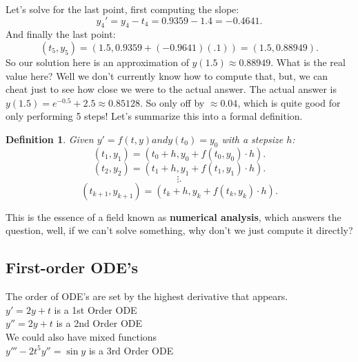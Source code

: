 \documentclass[10pt, oneside]{report}
\newtheorem{defn}{Definition}
\begin{document}
Let's solve for the last point, first computing the slope:
\[
y_4' = y_4-t_4 = 0.9359 - 1.4 = -0.4641
.\] 
And finally the last point:
\[
    (t_5, y_5) = (1.5, 0.9359 + (-0.9641)(.1)) = (1.5, 0.88949)
.\] 
So our solution here is an approximation of $y(1.5) \approx 0.88949$.  What is the real value here? Well we don't currently know how to compute that, but, we can cheat just to see how close we were to the actual answer.  The actual answer is $y(1.5) = e^{-0.5} + 2.5 \approx 0.85128$.  So only off by $\approx 0.04$, which is quite good for only performing 5 steps! Let's summarize this into a formal definition.  
\begin{defn}
    Given $y' = f(t, y) and y(t_0) = y_0$ with a stepsize $h$:
    \[
        (t_1, y_1) = (t_0 + h, y_0+f(t_0, y_0) \cdot h)
    .\] 
    \[
        (t_2, y_2) = (t_1 + h, y_1+f(t_1, y_1) \cdot h)
    .\] 
    \[
    \vdots
    .\] 
    \[
        (t_{k+1}, y_{k+1})=(t_k + h, y_k + f(t_k, y_k)\cdot h)
    .\] 
\end{defn}
This is the essence of a field known as \textbf{numerical analysis}, which answers the question, well, if we can't solve something, why don't we just compute it directly?

\subsection{First-order ODE's}
The order of ODE's are set by the highest derivative that appears.\\

$y' = 2y + t$ is a 1st Order ODE\\

$y'' = 2y + t$ is a 2nd Order ODE\\

We could also have mixed functions\\

$y''' - 2t^5 y'' = \sin y$ is a 3rd Order ODE\\
\end{document}
